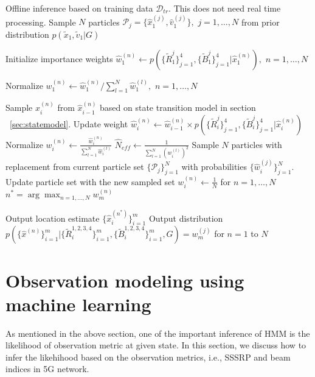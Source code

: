 \documentclass[conference, 10pt]{IEEEtran}
\begin{document}
\begin{algorithm}
\caption{$5GLocalizeAlgo(\mathcal{D}_{tr},G,N_{th})$}
\label{alg:LocalizeUEpf}
\begin{algorithmic}[1]
\State Offline inference based on training data $\mathcal{D}_{tr}$. This does not need real time processing.
\State Sample $N$ particles $\mathcal{P}_j = \{\hat{x}_1^{(j)},\hat{v}_1^{(j)}\},$ $j=1,\hdots , N$ 
from prior distribution $p(\tilde{x}_1, \tilde{v}_1|G)$ 

\State Initialize importance weights $\hat{w}_1^{(n)} \gets p(\{\tilde{R}^j_1\}_{j=1}^4,\{\tilde{B}^j_1\}_{j=1}^4|\hat{x}_1^{(n)}),$ $n=1,\hdots , N$

\State Normalize $w_1^{(n)} \gets \hat{w}_1^{(n)}/\sum_{l=1}^N \hat{w}_1^{(l)},$ $n=1,\hdots , N$

		\State Sample $\hat{x}_i^{(n)}$ from $\hat{x}_{i-1}^{(n)}$ based on state transition model in section ~\ref{sec:statemodel}.
		\State Update weight $\hat{w}_i^{(n)} \gets \hat{w}_{i-1}^{(n)} \times p(\{\tilde{R}^j_i\}_{j=1}^4, \{\tilde{B}^j_i\}_{j=1}^4|\hat{x}_{i}^{(n)})$ 
	\EndFor
	\State Normalize $w_i^{(n)} \gets \frac{\hat{w}_i^{(n)}}{\sum_{l=1}^N \hat{w}_i^{(l)}}$
	\State $\hat{N}_{eff} \gets \frac{1}{\sum_{l=1}^N (w_{i}^{(l)})^2}$
		\State Sample $N$ particles with replacement from current particle set $\{\mathcal{P}_j\}_{j=1}^N$ with probabilities $\{\hat{w}_i^{(j)}\}_{j=1}^N.$ Update particle set with the new sampled set
		\State $w_i^{(n)} \gets \frac{1}{N}$ for $n=1,\hdots , N$
	\EndIf
\EndFor
\State $n^* = \arg \max_{n = 1 , \hdots, N} w_m^{(n)}$

\State Output location estimate $\{\hat{x}_i^{(n^*)}\}_{i=1}^m$ 
\State Output distribution \\
$p(\{\hat{x}^{(n)}\}_{i=1}^m|\{\tilde{R}^{1,2,3,4}_i\}_{i=1}^m,\{\tilde{B}^{1,2,3,4}_i\}_{i=1}^m,G) = w_m^{(j)}$ for $n=1$ to $N$
\end{algorithmic}
\end{algorithm}  
\section{Observation modeling using machine learning}
\label{sec:channel-model}
As mentioned in the above section, one of the important inference of HMM is the likelihood of observation metric at given state. In this section, we discuss how to infer the likehihood based 
on the observation metrics, i.e., SSSRP and beam indices in 5G network. 
\end{document}
